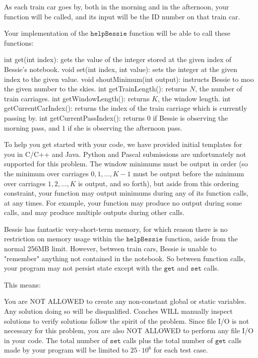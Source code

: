 \documentclass[12pt]{article}
\begin{document}
As each train car goes by, both in the morning and in the afternoon, your
function will be called, and its input will be the ID number on that train car. 

Your implementation of the $\texttt{helpBessie}$ function will be able to call
these functions:

  int get(int index): gets the value of the integer stored at the given
index of Bessie's notebook.
  void set(int index, int value): sets the integer at the given index to
the given value.
  void shoutMinimum(int output): instructs Bessie to moo the given number
to the skies.
  int getTrainLength(): returns $N$, the number of train carriages.
  int getWindowLength(): returns $K$, the window length.
  int getCurrentCarIndex(): returns the index of the train carriage which
is currently passing by.
  int getCurrentPassIndex(): returns $0$ if Bessie is observing the
morning pass, and $1$ if she is observing the afternoon pass.

To help you get started with your code, we have provided initial templates for you in
C/C++ and Java.  Python and Pascal submissions are unfortunately not supported for this problem.
The window minimums must be output in order (so the minimum over carriages
$0, 1, \dots, K-1$ must be output before the minimum over carriages
$1, 2, \dots, K$ is output, and so forth), but aside from this ordering
constraint, your function may output minimums during any of its function calls,
at any times. For example, your function may produce no output during some
calls, and may produce multiple outputs during other calls.

Bessie has fantastic very-short-term memory, for which reason there is no
restriction on memory usage within the $\texttt{helpBessie}$ function, aside
from the normal 256MB limit. However, between train cars, Bessie is unable to
"remember" anything not contained in the notebook. So between function calls,
your program may not persist state except with the $\texttt{get}$ and
$\texttt{set}$ calls.

This means:

 You are NOT ALLOWED to create any non-constant global or static variables.
Any solution doing so will be disqualified. Coaches WILL manually inspect
solutions to verify solutions follow the spirit of the problem.  Since file I/O
is not necessary for this problem, you are also NOT ALLOWED to perform any file
I/O in your code.
The total number of $\texttt{set}$ calls plus the total number of $\texttt{get}$
calls made by your program will be limited to $25 \cdot 10^6$ for each test
case.
\end{document}
